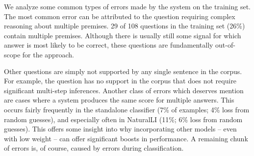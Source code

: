 %
%

We analyze some common types of errors made by the system on the training set.
The most common error can be attributed to the question requiring complex reasoning
  about multiple premises.
\num{29} of \num{108} questions in the training set (26\%) contain multiple
  premises.
Although there is usually still some signal for which answer is most likely to be correct,
  these questions are fundamentally out-of-scope for the approach.

Other questions are simply not supported by any single sentence in the corpus.
For example, the question  has
  no support in the corpus that does not require significant multi-step inferences.
Another class of errors which deserves mention are cases where a system produces
  the same score for multiple answers.
This occurs fairly frequently in the standalone classifier 
  (7\% of examples; 4\% loss from random guesses),
  and especially often in NaturalLI (11\%; 6\% loss from random guesses).
This offers some insight into why incorporating other models -- even with
  low weight -- can offer significant boosts in performance.
A remaining chunk of errors is, of course, caused by errors during classification.

